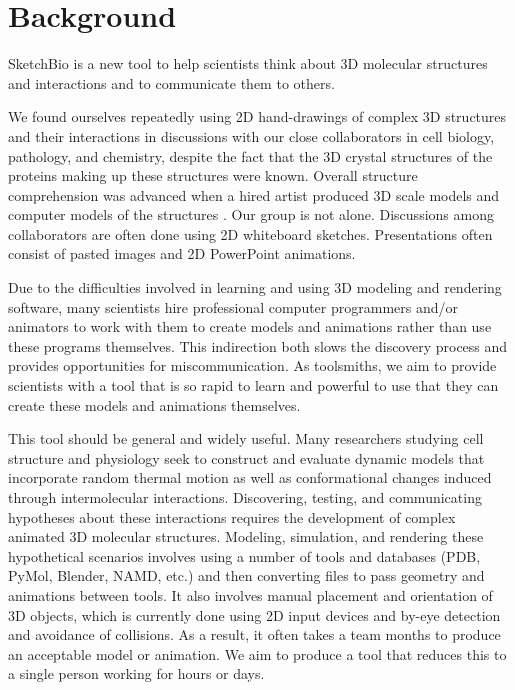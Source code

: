 \documentclass[twocolumn]{bmcart}%
\begin{document}
\section*{Background}

SketchBio is a new tool to help scientists think about 3D molecular structures and interactions and to communicate them to others.

We found ourselves repeatedly using 2D hand-drawings of complex 3D structures and their interactions in discussions with our close collaborators in cell biology, pathology, and chemistry, despite the fact that the 3D crystal structures of the proteins making up these structures were known.
Overall structure comprehension was advanced when a hired artist produced 3D scale models and computer models of the structures \cite{taylor2012}.  Our group is not alone.  Discussions among collaborators are often done using 2D whiteboard sketches.  Presentations often consist of pasted images and 2D PowerPoint animations.

Due to the difficulties involved in learning and using 3D modeling and rendering software, many scientists hire professional computer programmers and/or animators to work with them to create models and animations rather than use these programs themselves.
This indirection both slows the discovery process and provides opportunities for miscommunication.
As toolsmiths, we aim to provide scientists with a tool that is so rapid to learn and powerful to use that they can create these models and animations themselves.

This tool should be general and widely useful.  Many researchers studying cell structure and physiology seek to construct and evaluate dynamic models that incorporate random thermal motion as well as conformational changes induced through intermolecular interactions.
Discovering, testing, and communicating hypotheses about these interactions requires the development of complex animated 3D molecular structures. Modeling, simulation, and rendering these hypothetical scenarios involves using a number of tools and databases (PDB, PyMol, Blender, NAMD, etc.) and then converting files to pass geometry and animations between tools. It also involves manual placement and orientation of 3D objects, which is currently done using 2D input devices and by-eye detection and avoidance of collisions. As a result, it often takes a team months to produce an acceptable model or animation.
We aim to produce a tool that reduces this to a single person working for hours or days.
\end{document}

